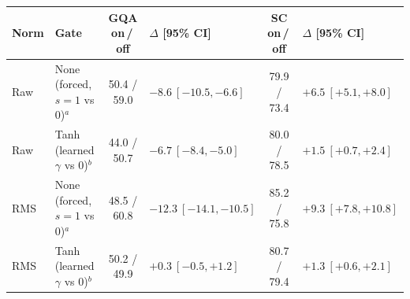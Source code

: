 \begin{tabular}{@{}ll cl cl@{}}
\toprule
Norm & Gate & GQA on\,/\,off & $\Delta$ [95\% CI] & SC on\,/\,off & $\Delta$ [95\% CI] \\
\midrule
Raw & None (forced, $s{=}1$ vs $0$)$^{a}$ & 50.4 / 59.0 & $-8.6\ [-10.5, -6.6]$ & 79.9 / 73.4 & $+6.5\ [+5.1, +8.0]$ \\
Raw & Tanh (learned $\gamma$ vs $0$)$^{b}$ & 44.0 / 50.7 & $-6.7\ [-8.4, -5.0]$ & 80.0 / 78.5 & $+1.5\ [+0.7, +2.4]$ \\
RMS & None (forced, $s{=}1$ vs $0$)$^{a}$ & 48.5 / 60.8 & $-12.3\ [-14.1, -10.5]$ & 85.2 / 75.8 & $+9.3\ [+7.8, +10.8]$ \\
RMS & Tanh (learned $\gamma$ vs $0$)$^{b}$ & 50.2 / 49.9 & $+0.3\ [-0.5, +1.2]$ & 80.7 / 79.4 & $+1.3\ [+0.6, +2.1]$ \\
\bottomrule
\end{tabular}
